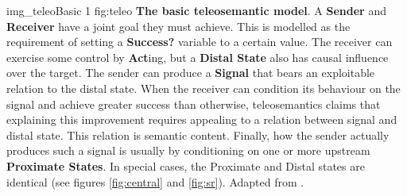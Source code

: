 \begin{myfig}
    {img_teleoBasic} %
    {1} %
    {fig:teleo} %
    {\textbf{The basic teleosemantic model}. 
    A \textbf{Sender} and \textbf{Receiver} have a joint goal they must achieve. 
    This is modelled as the requirement of setting a \textbf{Success?} variable to a certain value. 
    The receiver can exercise some control by \textbf{Act}ing, but a \textbf{Distal State} also has causal influence over the target. 
    The sender can produce a \textbf{Signal} that bears an exploitable relation to the distal state.
    When the receiver can condition its behaviour on the signal and achieve greater success than otherwise, teleosemantics claims that explaining this improvement requires appealing to a relation between signal and distal state.
    This relation is semantic content.
    Finally, how the sender actually produces such a signal is usually by conditioning on one or more upstream \textbf{Proximate States}.
    In special cases, the Proximate and Distal states are identical (see figures \ref{fig:central} and \ref{fig:sr}).
    Adapted from \citet[fig. 6.3, p. 78]{millikan2004varieties}.
    } %
\end{myfig}